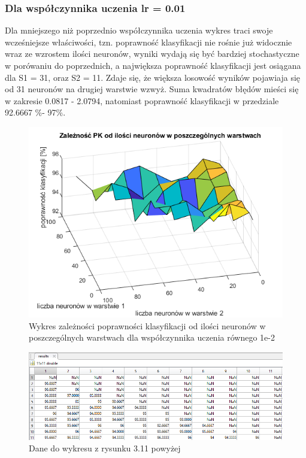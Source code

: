 \documentclass[a4paper, 12pt]{article}
\begin{document}
\clearpage
  
\newpage
\subsubsection{Dla współczynnika uczenia lr = 0.01}
Dla mniejszego niż poprzednio współczynnika uczenia wykres traci swoje wcześniejsze właściwości, tzn. poprawność klasyfikacji nie rośnie już widocznie wraz ze wzrostem ilości neuronów, wyniki wydają się być bardziej stochastyczne w porówaniu do poprzednich, a największa poprawność klasyfikacji jest osiągana dla S1 = 31, oraz S2 = 11. Zdaje się, że większa losowość wyników pojawiaja się od 31 neuronów na drugiej warstwie wzwyż. Suma kwadratów błędów mieści się w zakresie 0.0817 - 2.0794, natomiast poprawność klasyfikacji w przedziale 92.6667 \%- 97\%.

\begin{figure}[ht]
	\centering
	\includegraphics[width=12cm]{images/lr2 pk}
	\caption{Wykres zależności poprawności klasyfikacji od ilości neuronów w poszczególnych warstwach dla współczynnika uczenia równego 1e-2}
\label{Fig:lr1 pk}
\end{figure}

\begin{figure}[ht]
	\centering
	\includegraphics[width=12cm]{images/lr2 pk dane}
	\caption{Dane do wykresu z rysunku 3.11 powyżej}
\label{Fig:lr1 pk dane}
\end{figure}
\end{document}
